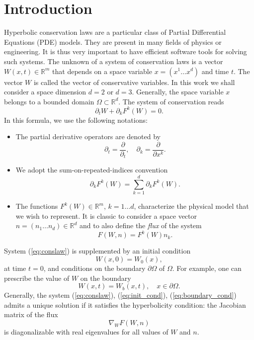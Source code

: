 \documentclass[12pt]{amsart}
\begin{document}


\section{Introduction}
Hyperbolic conservation laws are a particular class of Partial Differential Equations (PDE) models. They are present in many fields of physics or engineering. It is thus very important to have efficient software tools for solving such systems.
The unknown of a system of conservation laws is a vector $W(x,t)\in \mathbb{R}^m$ that depends on a space variable $x=(x^1\ldots x^d)$ and time $t$. The vector $W$ is called the vector of conservative variables. In this work we shall consider a space dimension $d=2$ or $d=3$. Generally, the space variable $x$ belongs to a bounded domain $\Omega\subset \mathbb{R}^d$. The system of conservation reads
\begin{equation}
\partial_t W + \partial_k F^k(W)=0. \label{eq:conslaw}
\end{equation}
In this formula, we use the following notations:
\begin{itemize}
\item The partial derivative operators  are denoted by $$\partial_t = \frac{\partial}{\partial_t},\quad \partial_k = \frac{\partial}{\partial {x^k}}.$$
\item We adopt the sum-on-repeated-indices convention $$\partial_k F^k(W) =\sum_{k=1}^{d}\partial_k F^k(W).$$
\item The functions $F^k(W)\in \mathbb{R}^m$, $k=1\ldots d$, characterize the physical model that we wish to represent. It is classic to consider a space vector $n=(n_1\ldots n_d)\in\mathbb{R}^d$ and to also define the \textit{flux} of the system $$F(W,n)=F^k(W)n_k.$$
\end{itemize}
System (\ref{eq:conslaw}) is supplemented by an initial condition
\begin{equation}\label{eq:init_cond}
W(x,0)=W_0(x),
\end{equation}
at time $t=0$, and conditions on the boundary $\partial \Omega$ of $\Omega$. For example, one can prescribe the value of $W$ on the boundary
\begin{equation}\label{eq:boundary_cond}
W(x,t)=W_b(x,t),\quad x\in\partial \Omega.
\end{equation}
Generally, the system (\ref{eq:conslaw}), (\ref{eq:init_cond}), (\ref{eq:boundary_cond}) admits a unique solution if it satisfies the hyperbolicity condition: the Jacobian matrix of the flux $$\nabla_W F(W,n)$$ is diagonalizable with real eigenvalues for all values of $W$ and $n$.
\end{document}
